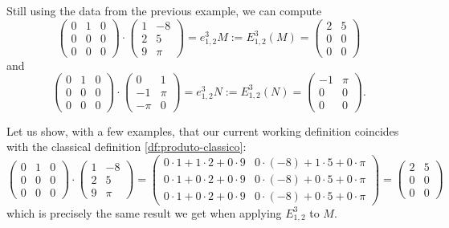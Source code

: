 \begin{ex}
	Still using the data from the previous example, we can compute
	\[\begin{pmatrix}
	0 & 1 & 0\\
	0&0&0\\
	0&0&0
	\end{pmatrix}\cdot\begin{pmatrix}
	1 & -8\\
	2 & 5\\
	9 &\pi
	\end{pmatrix}=e^3_{1,2}M:=E^3_{1,2}(M)=\begin{pmatrix}
	2 & 5\\0&0\\0&0
	\end{pmatrix}\]and
		\[\begin{pmatrix}
	0 & 1 & 0\\
	0&0&0\\
	0&0&0
	\end{pmatrix}\cdot\begin{pmatrix}
	0 & 1\\
	-1 & \pi\\
	-\pi &0
	\end{pmatrix}=e^3_{1,2}N:=E^3_{1,2}(N)=\begin{pmatrix}
	-1 &\pi\\0&0\\0&0
	\end{pmatrix}.\]
\end{ex}

\begin{rmk}
	Let us show, with a few examples, that our current working definition coincides with the classical definition \ref{df:produto-classico}:
	\[\begin{pmatrix}
	0 & 1 & 0\\
	0&0&0\\
	0&0&0
	\end{pmatrix}\cdot\begin{pmatrix}
	1 & -8\\
	2 & 5\\
	9 &\pi
	\end{pmatrix}=\begin{pmatrix}
	0\cdot 1+1\cdot 2+0\cdot 9 & 0\cdot(-8)+1\cdot 5+0\cdot\pi\\
	0\cdot1+0\cdot2+0\cdot 9 & 0\cdot(-8)+0\cdot 5+0\cdot \pi\\
	0\cdot1+0\cdot2+0\cdot 9 & 0\cdot(-8)+0\cdot 5+0\cdot \pi
	\end{pmatrix}=\begin{pmatrix}
	2 & 5\\0&0\\0&0
	\end{pmatrix}\]which is precisely the same result we get when applying $E^3_{1,2}$ to $M$.
\end{rmk}

